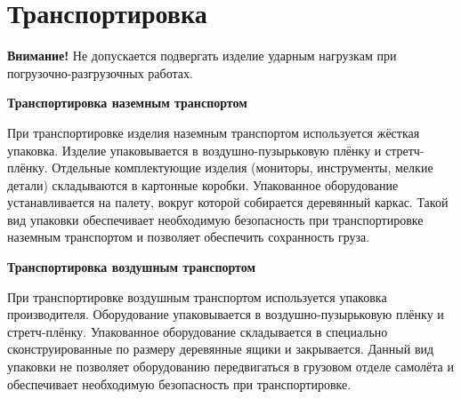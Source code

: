 \ifIsLngRus %
{

}
\fi

\ifIsLngEng %
{


}
\fi


\ifIsLngRus
{
    \section{Транспортировка}

    {\textcolor[rgb]{1,0,0}{\textbf{Внимание!}}} Не допускается подвергать изделие ударным нагрузкам при погрузочно-разгрузочных работах.
    
    \textbf{Транспортировка наземным транспортом}
    
    При транспортировке изделия наземным транспортом используется жёсткая упаковка. 
    Изделие упаковывается в воздушно-пузырьковую плёнку и стретч-плёнку.
    Отдельные комплектующие изделия (мониторы, инструменты, мелкие детали) складываются в картонные коробки.
    Упакованное оборудование устанавливается на палету, вокруг которой собирается деревянный каркас.
    Такой вид упаковки обеспечивает необходимую безопасность при транспортировке наземным транспортом и позволяет
    обеспечить сохранность груза.
    
    \textbf{Транспортировка воздушным транспортом}
    
    При транспортировке воздушным транспортом используется упаковка производителя. 
    Оборудование упаковывается в воздушно-пузырьковую плёнку и стретч-плёнку. 
    Упакованное оборудование складывается в специально сконструированные по размеру деревянные ящики и закрывается. 
    Данный вид упаковки не позволяет оборудованию передвигаться в грузовом отделе самолёта и обеспечивает
    необходимую безопасность при транспортировке.    
}
\fi

